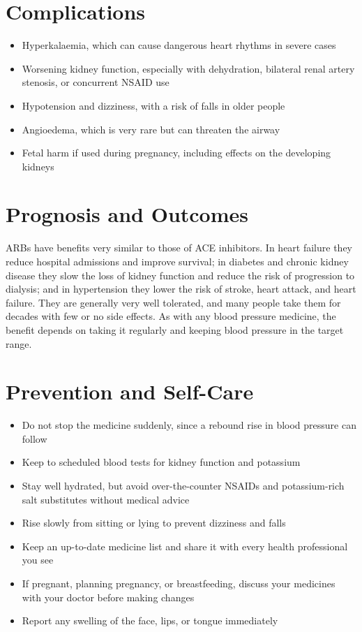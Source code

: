 \section*{Complications}
\begin{itemize}
    \item Hyperkalaemia, which can cause dangerous heart rhythms in severe cases
    \item Worsening kidney function, especially with dehydration, bilateral renal artery stenosis, or concurrent NSAID use
    \item Hypotension and dizziness, with a risk of falls in older people
    \item Angioedema, which is very rare but can threaten the airway
    \item Fetal harm if used during pregnancy, including effects on the developing kidneys
\end{itemize}

\section*{Prognosis and Outcomes}
ARBs have benefits very similar to those of ACE inhibitors. In heart failure they reduce hospital admissions and improve survival; in diabetes and chronic kidney disease they slow the loss of kidney function and reduce the risk of progression to dialysis; and in hypertension they lower the risk of stroke, heart attack, and heart failure. They are generally very well tolerated, and many people take them for decades with few or no side effects. As with any blood pressure medicine, the benefit depends on taking it regularly and keeping blood pressure in the target range.

\section*{Prevention and Self-Care}
\begin{itemize}
    \item Do not stop the medicine suddenly, since a rebound rise in blood pressure can follow
    \item Keep to scheduled blood tests for kidney function and potassium
    \item Stay well hydrated, but avoid over-the-counter NSAIDs and potassium-rich salt substitutes without medical advice
    \item Rise slowly from sitting or lying to prevent dizziness and falls
    \item Keep an up-to-date medicine list and share it with every health professional you see
    \item If pregnant, planning pregnancy, or breastfeeding, discuss your medicines with your doctor before making changes
    \item Report any swelling of the face, lips, or tongue immediately
\end{itemize}

